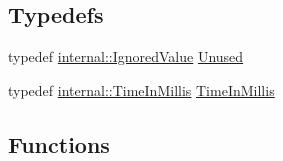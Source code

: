 \subsection*{Typedefs}
\begin{DoxyCompactItemize}
\item 
typedef \hyperlink{classtesting_1_1internal_1_1_ignored_value}{internal\+::\+Ignored\+Value} \hyperlink{namespacetesting_a603e329ec0263ebfcf16f712810bd511}{Unused}
\item 
typedef \hyperlink{namespacetesting_1_1internal_a66a845df404b38fe85c5e14a069f255a}{internal\+::\+Time\+In\+Millis} \hyperlink{namespacetesting_a992de1d091ce660f451d1e8b3ce30fd6}{Time\+In\+Millis}
\end{DoxyCompactItemize}
\subsection*{Functions}
